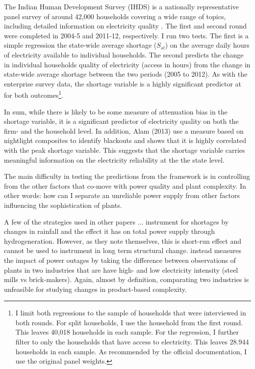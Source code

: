 \documentclass[11pt]{article}
\begin{document}
The Indian Human Development Survey (IHDS) is a nationally representative panel survey of around 42,000 households covering a wide range of topics, including detailed information on electricity quality \citep{desai_india_2018-1,desai_india_2018}. The first and second round were completed in 2004-5 and 2011-12, respectively. I run two tests. The first is a simple regression the state-wide average shortage (\(S_{st}\)) on the average daily hours of electricity available to individual households. The second predicts the change in individual households quality of electricity (access in hours) from the change in state-wide average shortage between the two periods (2005 to 2012). As with the enterprise survey data, the shortage variable is a highly significant predictor at for both outcomes\footnote{I limit both regressions to the sample of households that were interviewed in both rounds. For split households, I use the household from the first round. This leaves 40,018 households in each sample. For the regression, I further filter to only the households that have access to electricity. This leaves 28.944 households in each sample. As recommended by the official documentation, I use the original panel weights.}.

In sum, while there is likely to be some measure of attenuation bias in the shortage variable, it is a significant predictor of electricity quality on both the firm- and the household level. In addition, Alam (2013) use a measure based on nightlight composites to identify blackouts and shows that it is highly correlated with the peak shortage variable. This suggests that the shortage variable carries meaningful information on the electricity reliability at the the state level.

The main difficulty in testing the predictions from the framework is in controlling from the other factors that co-move with power quality and plant complexity. In other words: how can I separate an unreliable power supply from other factors influencing the sophistication of plants. 

A few of the strategies used in other papers ...  \cite{allcott_how_2016} instrument for shortages by changes in rainfall and the effect it has on total power supply through hydrogeneration. However, as they note themselves, this is short-run effect and cannot be used to instrument in long term structural change.  \cite{alam_coping_2013} instead measures the impact of power outages by taking the difference between observations of plants in two industries that are have high- and low electricity intensity (steel mills vs brick-makers). Again, almost by definition, comparating two industries is unfeasible for studying changes in product-based complexity.
\end{document}
